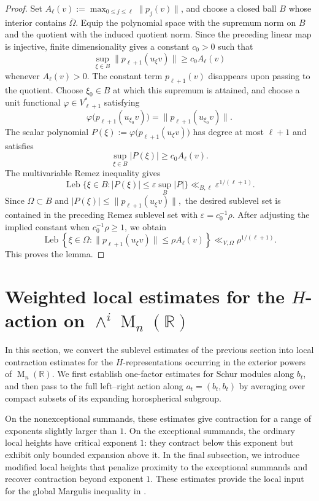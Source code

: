\documentclass[reqno,11pt]{amsart}
\numberwithin{equation}{section}
\theoremstyle{definition}
\theoremstyle{remark}
\newcommand{\op}{\operatorname}
\newcommand{\Leb}{\op{Leb}}
\newcommand{\M}{\op{M}}
\begin{document}
\begin{proof}
Set
$A_\ell(v):=\max_{0\le j\le\ell}\|p_j(v)\|$, and choose a closed ball
$B$ whose interior contains $\overline\Omega$. Equip the polynomial
space with the supremum norm on $B$ and the quotient with the induced
quotient norm. Since the preceding linear map is injective, finite
dimensionality gives a constant $c_0>0$ such that
$$
\sup_{\xi\in B}\|p_{\ell+1}(u_\xi v)\|
\ge c_0A_\ell(v)
$$
whenever $A_\ell(v)>0$. The constant term $p_{\ell+1}(v)$ disappears
upon passing to the quotient.
Choose $\xi_0\in B$ at which this supremum is attained, and choose a unit
functional $\varphi\in V_{\ell+1}^*$ satisfying
$$
\varphi\bigl(p_{\ell+1}(u_{\xi_0}v)\bigr)
=
\|p_{\ell+1}(u_{\xi_0}v)\|.
$$
The scalar polynomial
$
P(\xi):=\varphi\bigl(p_{\ell+1}(u_\xi v)\bigr)
$
has degree at most $\ell+1$ and satisfies
$$
\sup_{\xi\in B}|P(\xi)|\ge c_0A_\ell(v).
$$
The multivariable Remez inequality \cite{BrudnyiGanzburg1973} gives
$$
\Leb\{\xi\in B:|P(\xi)|\le\varepsilon\sup_B|P|\}
\ll_{B,\ell}\varepsilon^{1/(\ell+1)}.
$$
Since $\Omega\subset B$ and
$
|P(\xi)|\le\|p_{\ell+1}(u_\xi v)\|,
$
the desired sublevel set is contained in the preceding Remez sublevel
set with $\varepsilon=c_0^{-1}\rho$. After adjusting the implied
constant when $c_0^{-1}\rho\ge1$, we obtain
$$
\Leb\left\{\xi\in\Omega:
 \|p_{\ell+1}(u_\xi v)\|\le\rho A_\ell(v)
\right\}
\ll_{V,\Omega}\rho^{1/(\ell+1)}.
$$
This proves the lemma.
\end{proof}


\section[Weighted local estimates for the H-action]{Weighted local estimates for the \texorpdfstring{$H$}{H}-action on \texorpdfstring{$\wedge^i \M_n(\mathbb R)$}{exterior powers of matrix space}}
\label{s:weightedlocalestimates}
In this section, we convert the sublevel estimates of the previous section
into local contraction estimates for the $H$-representations occurring in
the exterior powers of $\M_n(\mathbb R)$. We first establish one-factor
estimates for Schur modules along $b_t$, and then pass to the full
left--right action along $a_t=(b_t,b_t)$ by averaging over compact subsets
of its expanding horospherical subgroup.

On the nonexceptional summands, these estimates give contraction for a range
of exponents slightly larger than $1$. On the exceptional summands, the
ordinary local heights have critical exponent $1$: they contract below this
exponent but exhibit only bounded expansion above it. In the final
subsection, we introduce modified local heights that penalize proximity to
the exceptional summands and recover contraction beyond exponent $1$. These
estimates provide the local input for the global Margulis inequality in
.
\end{document}
